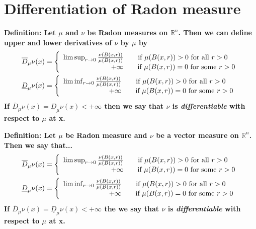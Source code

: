 \documentclass{article}
\begin{document}
\section{Differentiation of Radon measure}
\textbf{Definition: Let $\mu$ and $\nu$ be Radon measures on $\mathbb{R}^n$.
Then we can define upper and lower derivatives of $\nu$ by $\mu$ by
\begin{align*}
    &\overline D_\mu\nu(x) =
    \left\{\begin{array}{rcl}
        \limsup_{r\rightarrow0}\frac{\nu(B(x,r))}{\mu(B(x,r))} & \textnormal{if }\mu(B(x,r))>0\textnormal{ for all }r>0\\
        +\infty & \quad\textnormal{if }\mu(B(x,r))=0\textnormal{ for some }r>0
    \end{array}\right.\\
    &\underline D_\mu\nu(x) =
    \left\{\begin{array}{rcl}
        \liminf_{r\rightarrow0}\frac{\nu(B(x,r))}{\mu(B(x,r))} & \textnormal{if }\mu(B(x,r))>0\textnormal{ for all }r>0\\
        +\infty & \quad\textnormal{if }\mu(B(x,r))=0\textnormal{ for some }r>0
    \end{array}\right.
\end{align*}
If $\overline D_\mu\nu(x)=\underline D_\mu\nu(x)<+\infty$ then we say that $\nu$
is \emph{differentiable} with respect to $\mu$ at x.
}

\vspace{1ex}
\textbf{Definition: Let $\mu$ be Radon measure and $\nu$ be a vector measure on
$\mathbb{R}^n$. Then we say that...
\begin{align*}
    &\overline D_\mu\nu(x) =
    \left\{\begin{array}{rcl}
        \limsup_{r\rightarrow0}\frac{\nu(B(x,r))}{\mu(B(x,r))} & \textnormal{if }\mu(B(x,r))>0\textnormal{ for all }r>0\\
        +\infty & \quad\textnormal{if }\mu(B(x,r))=0\textnormal{ for some }r>0
    \end{array}\right.\\
    &\underline D_\mu\nu(x) =
    \left\{\begin{array}{rcl}
        \liminf_{r\rightarrow0}\frac{\nu(B(x,r))}{\mu(B(x,r))} & \textnormal{if }\mu(B(x,r))>0\textnormal{ for all }r>0\\
        +\infty & \quad\textnormal{if }\mu(B(x,r))=0\textnormal{ for some }r>0
    \end{array}\right.
\end{align*}
If $\overline D_\mu\nu(x)=\underline D_\mu\nu(x)<+\infty$ the we say that $\nu$
is \emph{differentiable} with respect to $\mu$ at x.
}
\end{document}
